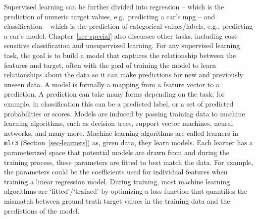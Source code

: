 Supervised learning can be further divided into
regression
-- which is the prediction of numeric target values, e.g.~predicting a
car's mpg -- and
classification
-- which is the prediction of categorical values/labels, e.g.,
predicting a car's model. Chapter~\ref{sec-special} also discusses other
tasks, including cost-sensitive
classification and unsupervised
learning. For any supervised learning task,
the goal is to build a model that captures the relationship
between the features and target, often with the goal of
training the model to learn relationships about
the data so it can make predictions for new and previously unseen data.
A
model
is formally a mapping from a feature vector to a prediction. A
prediction can take many forms depending on the task; for example, in
classification this can be a predicted label, or a set of predicted
probabilities or scores. Models are induced by passing training
data to machine learning algorithms, such as
decision trees, support vector
machines, neural
networks, and many more. Machine learning
algorithms are called
learners{} in
\texttt{mlr3} (Section~\ref{sec-learners}) as, given data, they learn
models. Each learner has a parameterized space that potential models are
drawn from and during the training process, these parameters are fitted
to best match the data. For example, the parameters could be the
coefficients used for individual features when training a linear
regression model. During training, most machine learning algorithms are
`fitted'/`trained'
by optimizing a loss-function that quantifies the mismatch between
ground truth target values in the training data and the predictions of
the model.

